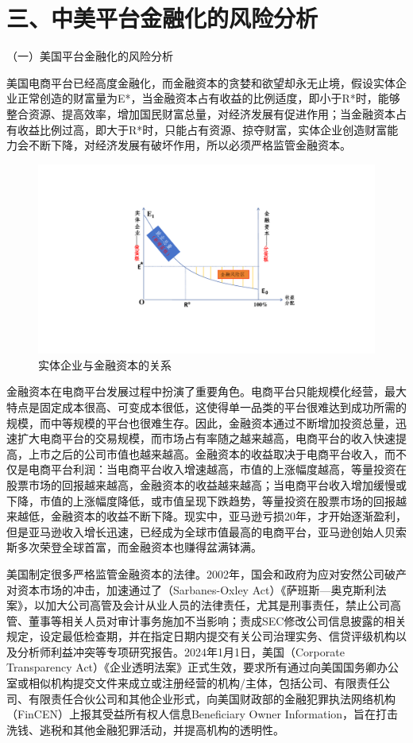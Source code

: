 \documentclass[12pt,twoside,utf8]{ctexart}
\begin{document}
{\centering\section *{三、中美平台金融化的风险分析}}

（一）美国平台金融化的风险分析

美国电商平台已经高度金融化，而金融资本的贪婪和欲望却永无止境，假设实体企业正常创造的财富量为E*，当金融资本占有收益的比例适度，即小于R*时，能够整合资源、提高效率，增加国民财富总量，对经济发展有促进作用；当金融资本占有收益比例过高，即大于R*时，只能占有资源、掠夺财富，实体企业创造财富能力会不断下降，对经济发展有破坏作用，所以必须严格监管金融资本。



\begin{figure}[hbt!]
\centering
\includegraphics[width=0.7\linewidth]{2.pdf}
\caption{实体企业与金融资本的关系}
\label{fig:map}
\end{figure}


金融资本在电商平台发展过程中扮演了重要角色。电商平台只能规模化经营，最大特点是固定成本很高、可变成本很低，这使得单一品类的平台很难达到成功所需的规模，而中等规模的平台也很难生存。因此，金融资本通过不断增加投资总量，迅速扩大电商平台的交易规模，而市场占有率随之越来越高，电商平台的收入快速提高，上市之后的公司市值也越来越高。金融资本的收益取决于电商平台收入，而不仅是电商平台利润：当电商平台收入增速越高，市值的上涨幅度越高，等量投资在股票市场的回报越来越高，金融资本的收益越来越高；当电商平台收入增加缓慢或下降，市值的上涨幅度降低，或市值呈现下跌趋势，等量投资在股票市场的回报越来越低，金融资本的收益不断下降。现实中，亚马逊亏损20年，才开始逐渐盈利，但是亚马逊收入增长迅速，已经成为全球市值最高的电商平台，亚马逊创始人贝索斯多次荣登全球首富，而金融资本也赚得盆满钵满。

美国制定很多严格监管金融资本的法律。2002年，国会和政府为应对安然公司破产对资本市场的冲击，加速通过了（Sarbanes-Oxley Act）《萨班斯—奥克斯利法案》，以加大公司高管及会计从业人员的法律责任，尤其是刑事责任，禁止公司高管、董事等相关人员对审计事务施加不当影响；责成SEC修改公司信息披露的相关规定，设定最低检查期，并在指定日期内提交有关公司治理实务、信贷评级机构以及分析师利益冲突等专项研究报告。2024年1月1日，美国（Corporate Transparency Act）《企业透明法案》正式生效，要求所有通过向美国国务卿办公室或相似机构提交文件来成立或注册经营的机构/主体，包括公司、有限责任公司、有限责任合伙公司和其他企业形式，向美国财政部的金融犯罪执法网络机构（FinCEN）上报其受益所有权人信息Beneficiary Owner Information，旨在打击洗钱、逃税和其他金融犯罪活动，并提高机构的透明性。
\end{document}
